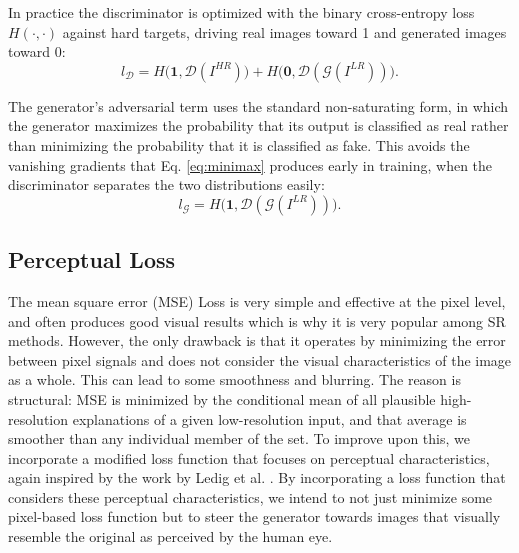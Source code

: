 \documentclass[conference]{IEEEtran}
\begin{document}
In practice the discriminator is optimized with the binary cross-entropy loss $H(\cdot,\cdot)$ against hard targets, driving real images toward 1 and generated images toward 0:
\begin{equation}
l_{\mathcal{D}} = H\big(\mathbf{1}, \mathcal{D}(I^{HR})\big) + H\big(\mathbf{0}, \mathcal{D}(\mathcal{G}(I^{LR}))\big).
\label{eq:disc}
\end{equation}

The generator's adversarial term uses the standard non-saturating form, in which the generator maximizes the probability that its output is classified as real rather than minimizing the probability that it is classified as fake. This avoids the vanishing gradients that Eq. \eqref{eq:minimax} produces early in training, when the discriminator separates the two distributions easily:
\begin{equation}
l_{\mathcal{G}} = H\big(\mathbf{1}, \mathcal{D}(\mathcal{G}(I^{LR}))\big).
\label{eq:gen}
\end{equation}

\subsection{Perceptual Loss}
\label{sec:perceptual}
The mean square error (MSE) Loss is very simple and effective at the pixel level, and often produces good visual results which is why it is very popular among SR methods. However, the only drawback is that it operates by minimizing the error between pixel signals and does not consider the visual characteristics of the image as a whole. This can lead to some smoothness and blurring. The reason is structural: MSE is minimized by the conditional mean of all plausible high-resolution explanations of a given low-resolution input, and that average is smoother than any individual member of the set. To improve upon this, we incorporate a modified loss function that focuses on perceptual characteristics, again inspired by the work by Ledig et al. \cite{ledig2017photo}. By incorporating a loss function that considers these perceptual characteristics, we intend to not just minimize some pixel-based loss function but to steer the generator towards images that visually resemble the original as perceived by the human eye.
\end{document}
